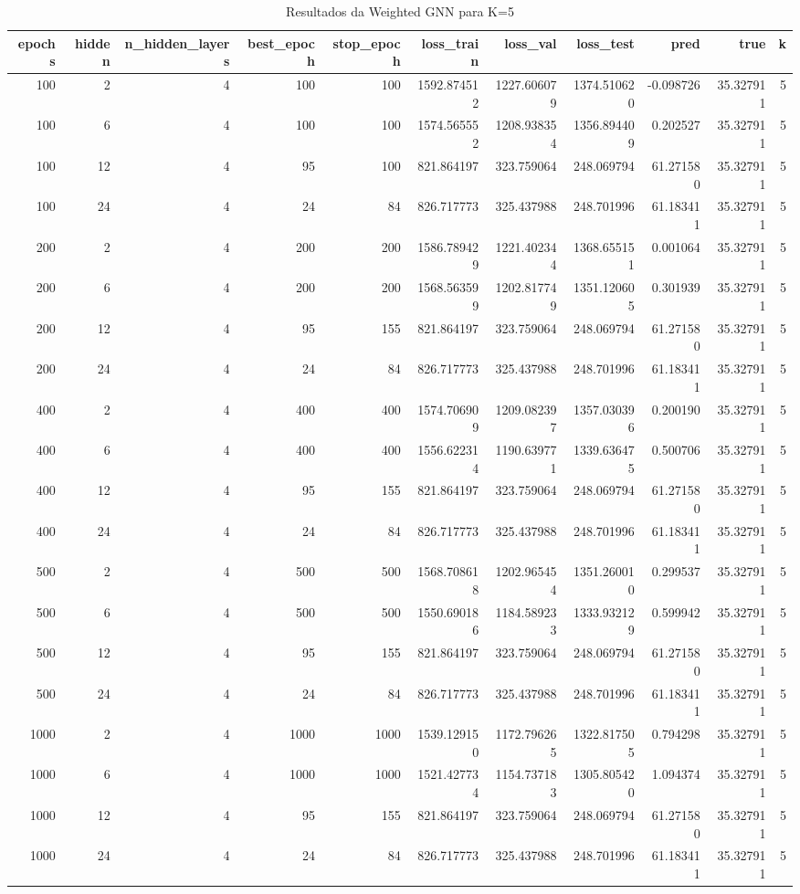 \begin{table}
\caption{Resultados da Weighted GNN para K=5}
\label{tab:weighted_gnn_results_k5}
\begin{tabular}{rrrrrrrrrrr}
\toprule
epochs & hidden & n\_hidden\_layers & best\_epoch & stop\_epoch & loss\_train & loss\_val & loss\_test & pred & true & k \\
\midrule
100 & 2 & 4 & 100 & 100 & 1592.874512 & 1227.606079 & 1374.510620 & -0.098726 & 35.327911 & 5 \\
100 & 6 & 4 & 100 & 100 & 1574.565552 & 1208.938354 & 1356.894409 & 0.202527 & 35.327911 & 5 \\
100 & 12 & 4 & 95 & 100 & 821.864197 & 323.759064 & 248.069794 & 61.271580 & 35.327911 & 5 \\
100 & 24 & 4 & 24 & 84 & 826.717773 & 325.437988 & 248.701996 & 61.183411 & 35.327911 & 5 \\
200 & 2 & 4 & 200 & 200 & 1586.789429 & 1221.402344 & 1368.655151 & 0.001064 & 35.327911 & 5 \\
200 & 6 & 4 & 200 & 200 & 1568.563599 & 1202.817749 & 1351.120605 & 0.301939 & 35.327911 & 5 \\
200 & 12 & 4 & 95 & 155 & 821.864197 & 323.759064 & 248.069794 & 61.271580 & 35.327911 & 5 \\
200 & 24 & 4 & 24 & 84 & 826.717773 & 325.437988 & 248.701996 & 61.183411 & 35.327911 & 5 \\
400 & 2 & 4 & 400 & 400 & 1574.706909 & 1209.082397 & 1357.030396 & 0.200190 & 35.327911 & 5 \\
400 & 6 & 4 & 400 & 400 & 1556.622314 & 1190.639771 & 1339.636475 & 0.500706 & 35.327911 & 5 \\
400 & 12 & 4 & 95 & 155 & 821.864197 & 323.759064 & 248.069794 & 61.271580 & 35.327911 & 5 \\
400 & 24 & 4 & 24 & 84 & 826.717773 & 325.437988 & 248.701996 & 61.183411 & 35.327911 & 5 \\
500 & 2 & 4 & 500 & 500 & 1568.708618 & 1202.965454 & 1351.260010 & 0.299537 & 35.327911 & 5 \\
500 & 6 & 4 & 500 & 500 & 1550.690186 & 1184.589233 & 1333.932129 & 0.599942 & 35.327911 & 5 \\
500 & 12 & 4 & 95 & 155 & 821.864197 & 323.759064 & 248.069794 & 61.271580 & 35.327911 & 5 \\
500 & 24 & 4 & 24 & 84 & 826.717773 & 325.437988 & 248.701996 & 61.183411 & 35.327911 & 5 \\
1000 & 2 & 4 & 1000 & 1000 & 1539.129150 & 1172.796265 & 1322.817505 & 0.794298 & 35.327911 & 5 \\
1000 & 6 & 4 & 1000 & 1000 & 1521.427734 & 1154.737183 & 1305.805420 & 1.094374 & 35.327911 & 5 \\
1000 & 12 & 4 & 95 & 155 & 821.864197 & 323.759064 & 248.069794 & 61.271580 & 35.327911 & 5 \\
1000 & 24 & 4 & 24 & 84 & 826.717773 & 325.437988 & 248.701996 & 61.183411 & 35.327911 & 5 \\
\bottomrule
\end{tabular}
\end{table}
